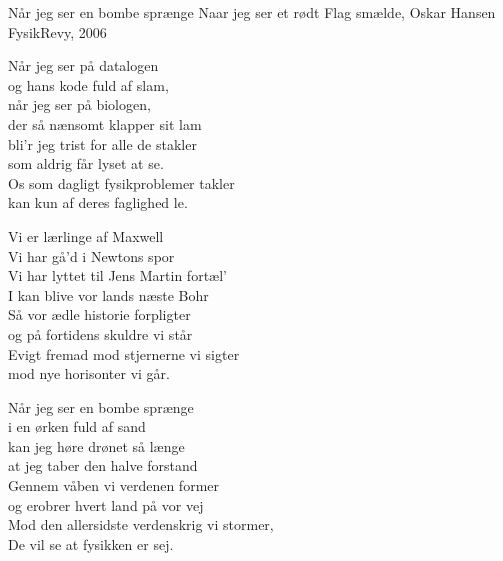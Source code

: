 \begin{song}{Når jeg ser en bombe sprænge}
  {} %
  {Naar jeg ser et rødt Flag smælde, Oskar Hansen} %
  {} %
  {FysikRevy, 2006} %
  {\NotCCLIed} %

  \begin{SBVerse}
    Når jeg ser på datalogen\\
    og hans kode fuld af slam,\\
    når jeg ser på biologen,\\
    der så nænsomt klapper sit lam\\
    bli'r jeg trist for alle de stakler\\
    som aldrig får lyset at se.\\
    Os som dagligt fysikproblemer takler\\
    kan kun af deres faglighed le.
  \end{SBVerse}

  \begin{SBVerse}
    Vi er lærlinge af Maxwell\\
    Vi har gå'd i Newtons spor\\
    Vi har lyttet til Jens Martin fortæl'\\
    I kan blive vor lands næste Bohr\\
    Så vor ædle historie forpligter\\
    og på fortidens skuldre vi står\\
    Evigt fremad mod stjernerne vi sigter\\
    mod nye horisonter vi går.
  \end{SBVerse}

  \begin{SBVerse}
    Når jeg ser en bombe sprænge\\
    i en ørken fuld af sand\\
    kan jeg høre drønet så længe\\
    at jeg taber den halve forstand\\
    Gennem våben vi verdenen former\\
    og erobrer hvert land på vor vej\\
    Mod den allersidste verdenskrig vi stormer,\\
    De vil se at fysikken er sej.
  \end{SBVerse}
\end{song}
